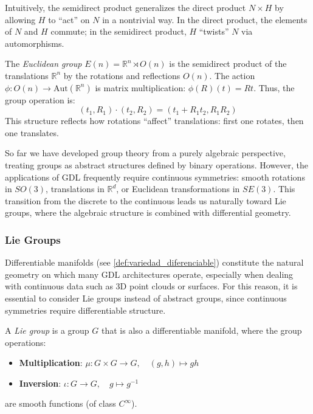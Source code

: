 Intuitively, the semidirect product generalizes the direct product $N \times H$ by allowing $H$ to ``act'' on $N$ in a nontrivial way. In the direct product, the elements of $N$ and $H$ commute; in the semidirect product, $H$ ``twists'' $N$ via automorphisms.

\begin{example}\label{ex:grupo_euclidiano_semidirecto}
The \textit{Euclidean group} $E(n) = \mathbb{R}^n \rtimes O(n)$ is the semidirect product of the translations $\mathbb{R}^n$ by the rotations and reflections $O(n)$. The action $\phi: O(n) \to \mathrm{Aut}(\mathbb{R}^n)$ is matrix multiplication: $\phi(R)(t) = Rt$. Thus, the group operation is:
\begin{equation}
(t_1, R_1) \cdot (t_2, R_2) = (t_1 + R_1 t_2, R_1 R_2)
\end{equation}
This structure reflects how rotations ``affect'' translations: first one rotates, then one translates.
\end{example}

So far we have developed group theory from a purely algebraic perspective, treating groups as abstract structures defined by binary operations. However, the applications of \gls{GDL} frequently require continuous symmetries: smooth rotations in $SO(3)$, translations in $\mathbb{R}^d$, or Euclidean transformations in $SE(3)$. This transition from the discrete to the continuous leads us naturally toward Lie groups, where the algebraic structure is combined with differential geometry.

\subsubsection{Lie Groups}

Differentiable manifolds (see \autoref{def:variedad_diferenciable}) constitute the natural geometry on which many \gls{GDL} architectures operate, especially when dealing with continuous data such as 3D point clouds or surfaces. For this reason, it is essential to consider Lie groups instead of abstract groups, since continuous symmetries require differentiable structure.

\begin{definition}\label{def:grupo_lie}
A \textit{Lie group} is a group $G$ that is also a differentiable manifold, where the group operations:
\begin{itemize}
    \item \textbf{Multiplication}: $\mu: G \times G \rightarrow G, \quad (g,h) \mapsto gh$
    \item \textbf{Inversion}: $\iota: G \rightarrow G, \quad g \mapsto g^{-1}$
\end{itemize}
are smooth functions (of class $C^\infty$).
\end{definition}

